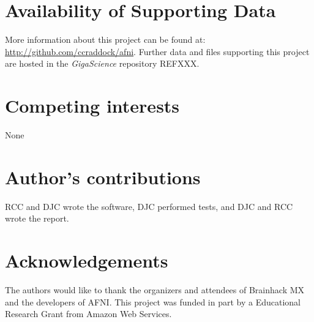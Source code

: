 \documentclass[twocolumn]{bmcart}%
\begin{document}
\begin{backmatter}

\section*{Availability of Supporting Data}
More information about this project can be found at: \url{http://github.com/ccraddock/afni}. Further data and files supporting this project are hosted in the \emph{GigaScience} repository REFXXX.

\section*{Competing interests}
None

\section*{Author's contributions}
RCC and DJC wrote the software, DJC performed tests, and DJC and RCC
wrote the report.

\section*{Acknowledgements}
The authors would like to thank the organizers and attendees of
Brainhack MX and the developers of AFNI. This project was funded in part
by a Educational Research Grant from Amazon Web Services.

  
  


\end{backmatter}
\end{document}
